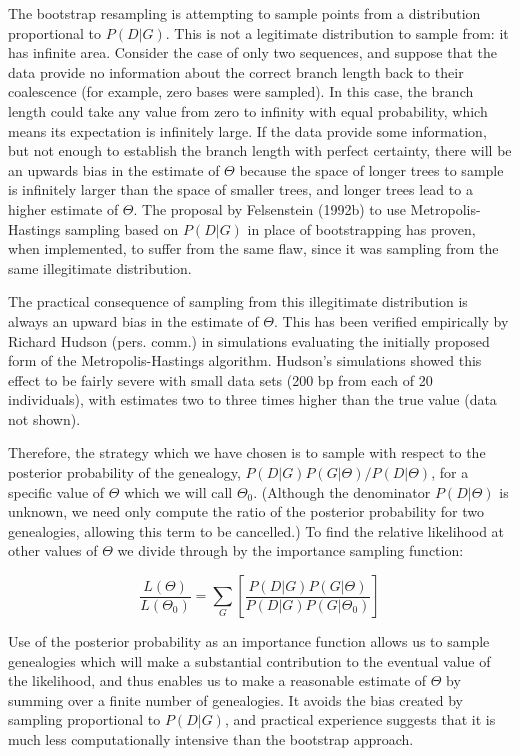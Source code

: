 \documentclass[12pt]{article}
\begin{document}
The bootstrap resampling is attempting to sample points from a
distribution proportional to $P(D|G)$.  This is not a legitimate
distribution to sample from:  it has infinite area.  Consider the case
of only two sequences, and suppose that the data provide no information
about the correct branch length back to their coalescence (for example,
zero bases were sampled).  In this
case, the branch length could take any value from zero to infinity with
equal probability, which means its expectation is infinitely large.
If the data provide some information, but not enough to establish the
branch length with perfect certainty, there will be an upwards bias in
the estimate of $\Theta$ because the space of longer trees to sample is
infinitely larger than the space of smaller trees, and longer
trees lead to a higher estimate of $\Theta$.
The proposal by {\sc Felsenstein} (1992b) to use Metropolis-Hastings
sampling based on $P(D|G)$ in place of bootstrapping has proven, when
implemented, to suffer from the same flaw, since it was sampling from
the same illegitimate distribution.

The practical consequence of sampling from this illegitimate
distribution is always an upward bias in the estimate of $\Theta$.  This
has been verified empirically by {\sc Richard Hudson} (pers. comm.) in simulations
evaluating the initially proposed form of the Metropolis-Hastings algorithm.  
{\sc Hudson's} simulations showed this
effect to be fairly severe with small data sets (200 bp from each of 20
individuals), with estimates two to three times higher than the true
value (data not shown).

Therefore, the strategy which we have chosen is to sample with respect to the
posterior probability of the genealogy, $P(D|G)P(G|\Theta)/P(D|\Theta)$, for a 
specific value of $\Theta$ which we will call $\Theta_{0}$.  (Although
the denominator $P(D|\Theta)$ is unknown, we need only compute the
ratio of the posterior probability for two genealogies, allowing this
term to be cancelled.)  To find the relative likelihood at other values of
$\Theta$ we divide through by the importance sampling function:

\begin{equation}
\frac{L(\Theta) }{L(\Theta_0)}
= \sum_{G} \left [ \frac{P(D|G)P(G|\Theta)}{P(D|G)P(G|\Theta_{0})}
\right ]
\end{equation}

Use of the posterior probability as an importance function allows us to sample 
genealogies which will 
make a substantial contribution to the eventual value of the likelihood, and
thus enables us to make a reasonable estimate of $\Theta$ by summing over a
finite number of genealogies.  It avoids the bias created by sampling
proportional to $P(D|G)$,
and practical experience suggests that it is much
less computationally intensive than the bootstrap approach.
\end{document}
